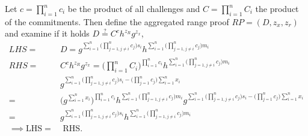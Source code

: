 Let $c=\prod_{i=1}^n c_i$ be the product of all challenges and $C= \prod_{i=1}^n C_i$ the product of the commitments.  Then define the aggregated range proof $RP = (D,z_x,z_r)$ and examine if it holds $D\overset{?}{=} C^ch^{z_R}g^{z_x}$, 
\begin{align*}
LHS =& D = g ^ {\sum_{i=1}^n \Big(\prod_{j=1, j\neq i}^n   c_j \Big)s_i} h^ {\sum_{i=1}^n \Big(\prod_{j=1, j\neq i}^n   c_j \Big)m_i}  \\
RHS =& C^ch^{z_R}g^{z_x} =  \Big( \prod_{i=1}^n C_i \Big)^{\prod_{i=1}^n c_i}h^{\sum_{i=1}^n \Big( \prod_{j=1, j\neq i}^n c_j \Big)m_i}\\
&g^{ \sum_{i=1}^n \Big( \prod_{j=1, j\neq i}^n c_j \Big)s_i - \big( \prod_{j=1}^n c_j \Big) \sum_{i=1}^n x_i}\\ 
 =& \Big( g^{\sum_{i=1}^n x_i} \Big)^{\prod_{i=1}^n c_i}h^{\sum_{i=1}^n \Big( \prod_{j=1, j\neq i}^n c_j \Big)m_i} g^{ \sum_{i=1}^n \Big( \prod_{j=1, j\neq i}^n c_j \Big)s_i - \big( \prod_{j=1}^n c_j \Big) \sum_{i=1}^n x_i} \\
=&  g^{  \sum_{i=1}^n \Big( \prod_{j=1, j\neq i}^n c_j \Big)s_i } h^{\sum_{i=1}^n \Big( \prod_{j=1, j\neq i}^n c_j \Big)m_i}  
\\ \implies \text{LHS} =& \text{ RHS}.
\end{align*}



